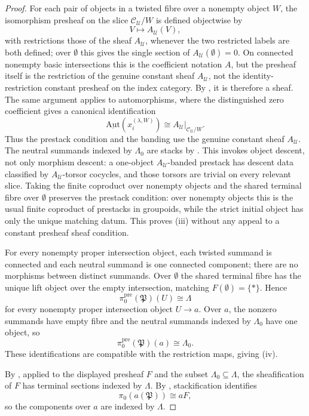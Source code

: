 \begin{proof}
For each pair of objects in a twisted fibre over a nonempty object $W$, the
isomorphism presheaf on the slice \(\mathcal C_{\mathcal U}/W\) is defined
objectwise by
\[
V\longmapsto A_{\mathcal U}(V),
\]
with restrictions those of the sheaf \(A_{\mathcal U}\), whenever the two
restricted labels are both defined; over \(\emptyset\) this gives the
single section of \(A_{\mathcal U}(\emptyset)=0\). On connected nonempty
basic intersections this is the coefficient notation \(A\), but the
presheaf itself is the restriction of the genuine constant sheaf
\(A_{\mathcal U}\), not the identity-restriction constant presheaf on the
index category. By
, it is therefore a sheaf.
The same argument applies to automorphisms,
where the distinguished zero coefficient gives a canonical identification
\[
\underline{\mathrm{Aut}}(x_i^{(\lambda,W)})
\cong A_{\mathcal U}|_{\mathcal C_{\mathcal U}/W}.
\]
Thus the prestack condition and the banding use the genuine constant sheaf
$A_{\mathcal U}$. The neutral summands indexed by \(\Lambda_0\) are stacks by
. This invokes object descent, not
only morphism descent: a one-object \(A_{\mathcal U}\)-banded prestack has
descent data classified by \(A_{\mathcal U}\)-torsor cocycles, and those
torsors are trivial on every relevant slice. Taking the finite coproduct
over nonempty objects and the shared terminal fibre over $\emptyset$ preserves the prestack
condition: over nonempty objects this is the usual finite coproduct of
prestacks in groupoids, while the strict initial object has only the unique
matching datum. This proves \textup{(iii)} without any appeal to a
constant presheaf sheaf condition.

For every nonempty proper intersection object, each twisted summand is
connected and each neutral summand is one connected component; there are no
morphisms between distinct summands. Over $\emptyset$ the shared terminal
fibre has the unique lift object over the empty intersection, matching $F(\emptyset)=\{\ast\}$.
Hence
\[
\pi_0^{\mathrm{pre}}(\mathfrak P)(U)\cong\Lambda
\]
for every nonempty proper intersection object $U\to a$. Over $a$, the
nonzero summands have empty fibre and the neutral summands indexed by
\(\Lambda_0\) have one object, so
\[
\pi_0^{\mathrm{pre}}(\mathfrak P)(a)\cong\Lambda_0.
\]
These identifications are compatible with the restriction maps, giving \textup{(iv)}.

By , applied to the displayed
presheaf \(F\) and the subset \(\Lambda_0\subseteq\Lambda\), the
sheafification of \(F\) has terminal sections indexed by \(\Lambda\). By
, stackification identifies
\[
\pi_0(a(\mathfrak P))\cong aF,
\]
so the components over $a$ are indexed by $\Lambda$.


\end{proof}
